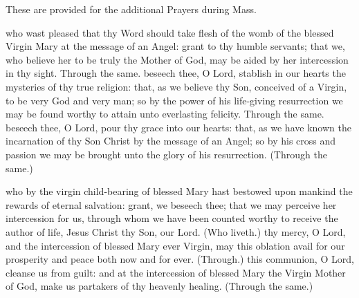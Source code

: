    \fancyhead[RO,LE]{}
   \fancyhead[RE,LO]{}
\begin{secrubric}
	These are provided for the additional Prayers during Mass.
\end{secrubric}
   \begin{multicols}{2}
   \label{SPMaryInAdvent}
    who wast pleased that thy Word should take flesh of the womb of the blessed Virgin Mary at the message of an Angel: grant to thy humble servants; that we, who believe her to be truly the Mother of God, may be aided by her intercession in thy sight. Through the same.
    beseech thee, O Lord, stablish in our hearts the mysteries of thy true religion: that, as we believe thy Son, conceived of a Virgin, to be very God and very man; so by the power of his life-giving resurrection we may be found worthy to attain unto everlasting felicity. Through the same.
    beseech thee, O Lord, pour thy grace into our hearts: that, as we have known the incarnation of thy Son Christ by the message of an Angel; so by his cross and passion we may be brought unto the glory of his resurrection. (Through the same.)

    \label{SPMaryPostChristmas}
     who by the virgin child-bearing of blessed Mary hast bestowed upon mankind the rewards of eternal salvation: grant, we beseech thee; that we may perceive her intercession for us, through whom we have been counted worthy to receive the author of life, Jesus Christ thy Son, our Lord. (Who liveth.)
     thy mercy, O Lord, and the intercession of blessed Mary ever Virgin, may this oblation avail for our prosperity and peace both now and for ever. (Through.)
     this communion, O Lord, cleanse us from guilt: and at the intercession of blessed Mary the Virgin Mother of God, make us partakers of thy heavenly healing. (Through the same.)
    

\end{multicols}
